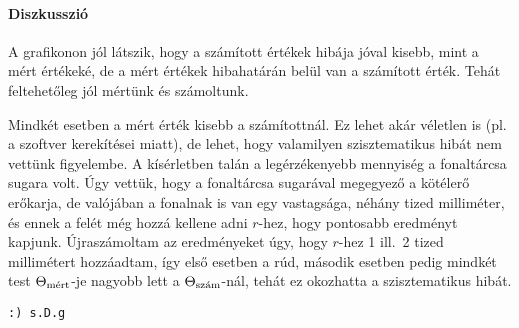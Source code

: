 \documentclass[12pt]{article}
\begin{document}
\paragraph*{Diszkusszió}
A grafikonon jól látszik, hogy a számított értékek hibája jóval kisebb, mint a mért értékeké, de a mért értékek hibahatárán belül van a számított érték. Tehát feltehetőleg jól mértünk és számoltunk.

Mindkét esetben a mért érték kisebb a számítottnál. Ez lehet akár véletlen is (pl. a szoftver kerekítései miatt), de lehet, hogy valamilyen szisztematikus hibát nem vettünk figyelembe. A kísérletben talán a legérzékenyebb mennyiség a fonaltárcsa sugara volt. Úgy vettük, hogy a fonaltárcsa sugarával megegyező a kötélerő erőkarja, de valójában a fonalnak is van egy vastagsága, néhány tized milliméter, és ennek a felét még hozzá kellene adni $r$-hez, hogy pontosabb eredményt kapjunk. Újraszámoltam az eredményeket úgy, hogy $r$-hez 1 ill.\ 2 tized millimétert hozzáadtam, így első esetben a rúd, második esetben pedig mindkét test $\Thetamert$-je nagyobb lett a $\Thetaszam$-nál, tehát ez okozhatta a szisztematikus hibát.

\texttt{:) s.D.g}
\end{document}

